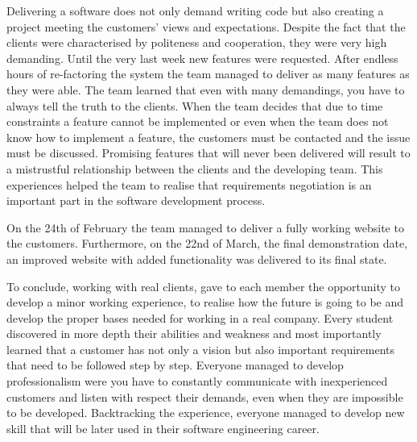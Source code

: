 \documentclass{l3proj}
\begin{document}
Delivering a software does not only demand writing code but also creating a project meeting the customers' views and expectations. Despite the fact that the clients were characterised by politeness and cooperation, they were very high demanding. Until the very last week new features were requested. After endless hours of re-factoring the system the team managed to deliver as many features as they were able. The team learned that even with many demandings, you have to always tell the truth to the clients. When the team decides that due to time constraints a feature cannot be implemented or even when the team does not know how to implement a feature, the customers must be contacted and the issue must be discussed. Promising features that will never been delivered will result to a mistrustful relationship between the clients and the developing team. This experiences helped the team to realise that requirements negotiation is an important part in the software development process.

On the 24th of February the team managed to deliver a fully working website to the customers. Furthermore, on the 22nd of March, the final demonstration date, an improved website with added functionality was delivered to its final state.

To conclude, working with real clients, gave to each member the opportunity to develop a minor working experience, to realise how the future is going to be and develop the proper bases needed for working in a real company. Every student discovered in more depth their abilities and weakness and most importantly learned that a customer has not only a vision but also important requirements that need to be followed step by step. Everyone managed to develop professionalism were you have to constantly communicate with inexperienced customers and listen with respect their demands, even when they are impossible to be developed. Backtracking the experience, everyone managed to develop new skill that will be later used in their software engineering career.



\newpage


\end{document}
